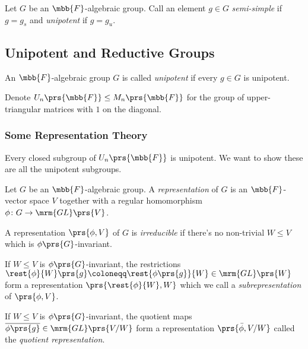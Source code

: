 \documentclass[10pt,a4paper,twoside,openany,hidelinks]{book}
\begin{document}
\begin{definition}
Let $G$ be an $\mbb{F}$-algebraic group. Call an element $g \in G$ \emph{semi-simple} if $g = g_s$ and \emph{unipotent} if $g = g_u$.
\end{definition}

\subsection{Unipotent and Reductive Groups}

\begin{definition}
An $\mbb{F}$-algebraic group $G$ is called \emph{unipotent} if every $g \in G$ is unipotent.
\end{definition}

\begin{notation}
Denote $U_n\prs{\mbb{F}} \leq M_n\prs{\mbb{F}}$ for the group of upper-triangular matrices with $1$ on the diagonal.
\end{notation}

\subsubsection{Some Representation Theory}

Every closed subgroup of $U_n\prs{\mbb{F}}$ is unipotent. We want to show these are all the unipotent subgroups.

\begin{definition}[Representation]
Let $G$ be an $\mbb{F}$-algebraic group. A \emph{representation} of $G$ is an $\mbb{F}$-vector space $V$ together with a regular homomorphism $\phi \colon G \to \mrm{GL}\prs{V}$.
\end{definition}

\begin{definition}
A representation $\prs{\phi, V}$ of $G$ is \emph{irreducible} if there's no non-trivial $W \leq V$ which is $\phi\prs{G}$-invariant.
\end{definition}

\begin{definition}[Subrepresentation]
If $W \leq V$ is $\phi\prs{G}$-invariant, the restrictions $\rest{\phi}{W}\prs{g} \coloneqq \rest{\phi\prs{g}}{W} \in \mrm{GL}\prs{W}$ form a representation $\prs{\rest{\phi}{W}, W}$ which we call a \emph{subrepresentation} of $\prs{\phi, V}$. 
\end{definition}

\begin{definition}
If $W \leq V$ is $\phi\prs{G}$-invariant, the quotient maps $\overline{\phi\prs{g}} \in \mrm{GL}\prs{V/W}$ form a representation $\prs{\bar{\phi}, V/W}$ called the \emph{quotient representation}.
\end{definition}
\end{document}
